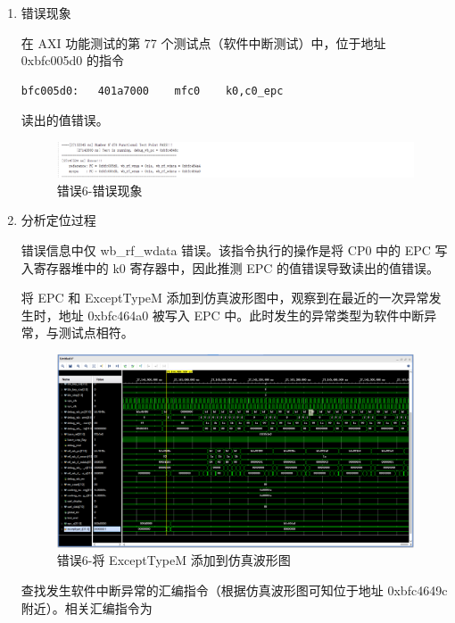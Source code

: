 \begin{enumerate}[(1)]
    \item 错误现象

在 AXI 功能测试的第 77 个测试点（软件中断测试）中，位于地址 0xbfc005d0 的指令

\begin{lstlisting}
bfc005d0:	401a7000 	mfc0	k0,c0_epc
\end{lstlisting}

读出的值错误。

\begin{figure}[H]
    \centering
    \includegraphics[width=\textwidth]{image/错误6-错误现象1.png}
    \caption{错误6-错误现象}
    \label{fig:错误6-错误现象1}
\end{figure}

    \item 分析定位过程

错误信息中仅 wb\_rf\_wdata 错误。该指令执行的操作是将 CP0 中的 EPC 写入寄存器堆中的 k0 寄存器中，因此推测 EPC 的值错误导致读出的值错误。

将 EPC 和 ExceptTypeM 添加到仿真波形图中，观察到在最近的一次异常发生时，地址 0xbfc464a0 被写入 EPC 中。此时发生的异常类型为软件中断异常，与测试点相符。

\begin{figure}[H]
    \centering
    \includegraphics[width=\textwidth]{image/错误6-分析定位过程1.png}
    \caption{错误6-将 ExceptTypeM 添加到仿真波形图}
    \label{fig:错误6-分析定位过程1}
\end{figure}

查找发生软件中断异常的汇编指令（根据仿真波形图可知位于地址 0xbfc4649c 附近）。相关汇编指令为


\end{enumerate}
